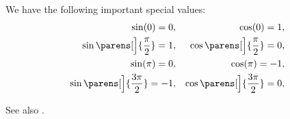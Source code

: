 \begin{proposition}\label{thm:trigonometric_function_basic_roots}
  We have the following important special values:
  \begin{align}
    \sin(0) = 0,                              && \cos(0) = 1,                             \label{eq:thm:trigonometric_function_basic_roots/zero} \\
    \sin\parens[\Big]{ \frac \pi 2 } = 1,     && \cos\parens[\Big]{ \frac \pi 2 } = 0,    \label{eq:thm:trigonometric_function_basic_roots/half} \\
    \sin(\pi) = 0,                            && \cos(\pi) = -1,                          \label{eq:thm:trigonometric_function_basic_roots/whole} \\
    \sin\parens[\Big]{ \frac {3\pi} 2 } = -1, && \cos\parens[\Big]{ \frac {3\pi} 2 } = 0, \label{eq:thm:trigonometric_function_basic_roots/sesqui}
  \end{align}
\end{proposition}
\begin{comments}
  \item See also .
\end{comments}
